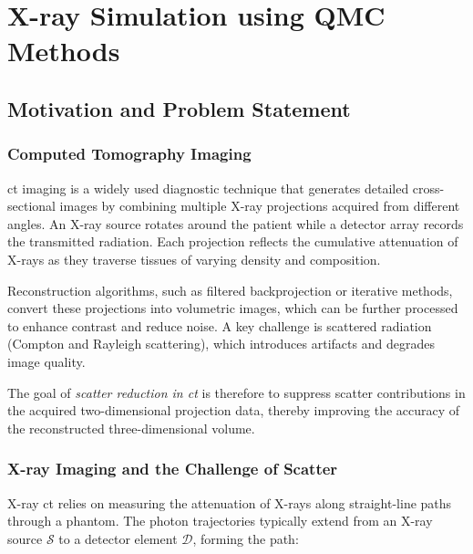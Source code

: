 \part{X-ray Simulation using QMC Methods}
\label{part3}

\chapter{Motivation and Problem Statement} %
\label{chapter8}


\section{Computed Tomography Imaging}

\acf{ct} imaging is a widely used diagnostic technique that generates detailed
cross-sectional images by combining multiple X-ray projections acquired from
different angles. An X-ray source rotates around the patient while a detector
array records the transmitted radiation. Each projection reflects the cumulative
attenuation of X-rays as they traverse tissues of varying density and
composition.

Reconstruction algorithms, such as filtered backprojection or iterative methods,
convert these projections into volumetric images, which can be further processed
to enhance contrast and reduce noise. A key challenge is scattered radiation
(Compton and Rayleigh scattering), which introduces artifacts and degrades image
quality.

The goal of \textit{scatter reduction in \ac{ct}} is therefore to suppress
scatter contributions in the acquired two-dimensional projection data, thereby
improving the accuracy of the reconstructed three-dimensional volume.


\section{X-ray Imaging and the Challenge of Scatter}

X-ray \ac{ct} relies on measuring the attenuation of X-rays along straight-line
paths through a phantom. The photon trajectories typically extend from an X-ray
source $\mathcal{S}$ to a detector element $\mathcal{D}$, forming the path:

